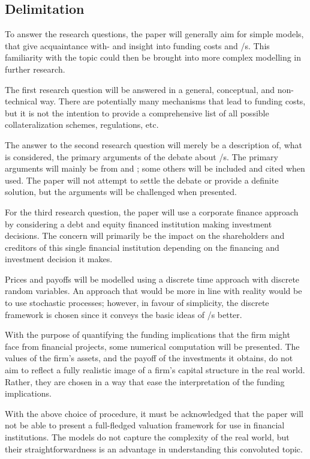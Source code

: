 \documentclass[main.tex]{subfiles}
\begin{document}
    \subsection{Delimitation}

    To answer the research questions, the paper will generally aim for simple models,
    that give acquaintance with- and insight into funding costs and \FVA/s.
    This familiarity with the topic could then be brought into more complex modelling
    in further research.

    The first research question will be answered in a general, conceptual, and 
    non-tech\-nical %
    way.
    There are potentially many mechanisms that lead to funding costs,
    but it is not the intention to provide a comprehensive list 
    of all possible collateralization schemes, regulations, etc.

    The answer to the second research question will merely be a description 
    of, what is considered, the primary arguments of the debate about \FVA/s.
    The primary arguments will mainly be from 
    \textcite{HullWhite2012FVA} and \textcite{Castagna2012FVA};
    some others will be included and cited when used.
    The paper will not attempt to settle the debate or provide a definite solution,
    but the arguments will be challenged when presented.

    For the third research question, the paper will use a corporate finance approach
    by considering a debt and equity financed institution making investment decisions.
    The concern will primarily be the impact on the shareholders and creditors 
    of this single financial institution depending on the financing and investment decision it makes.

    Prices and payoffs will be modelled using a discrete time approach 
    with discrete random variables.
    An approach that would be more in line with reality would be to use stochastic processes;
    however, in favour of simplicity, the discrete framework is chosen 
    since it conveys the basic ideas of \FVA/s better.

    With the purpose of quantifying the funding implications that the firm might face from financial projects,
    some numerical computation will be presented.
    The values of the firm's assets, and the payoff of the investments it obtains,
    do not aim to reflect a fully realistic image of a firm's capital structure in the real world.
    Rather, they are chosen in a way that ease the interpretation of the funding implications.

    With the above choice of procedure, it must be acknowledged that the paper will not be able to
    present a full-fledged valuation framework for use in financial institutions.
    The models do not capture the complexity of the real world,
    but their straightforwardness is an advantage in understanding this convoluted topic.
\end{document}
